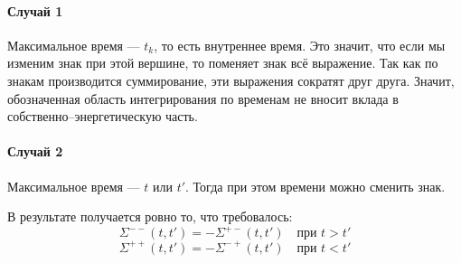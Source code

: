 \documentclass{article}
\begin{document}
\paragraph{Случай 1}
Максимальное время --- $t_k$, то есть внутреннее время. Это значит, что 
если мы изменим знак при этой вершине, то поменяет знак всё выражение.
Так как по знакам производится суммирование, эти выражения сократят друг
друга. Значит, обозначенная область интегрирования по временам не вносит
вклада в собственно--энергетическую часть.
\paragraph{Случай 2}
Максимальное время --- $t$ или $t'$. Тогда при этом времени можно сменить
знак. 

В результате получается ровно то, что требовалось:
\begin{equation}
	\Sigma^{--}(t,t') = -\Sigma^{+-}(t,t') \quad \mbox{при } t > t'
\end{equation}
\begin{equation}
	\Sigma^{++}(t,t') = -\Sigma^{-+}(t,t') \quad \mbox{при } t < t'
\end{equation}
\end{document}
